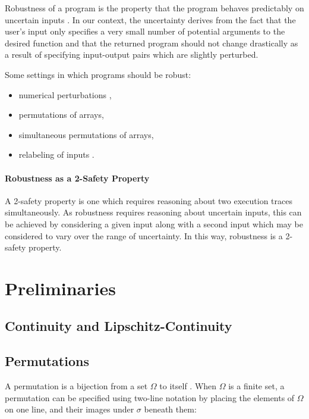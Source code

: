 \documentclass{llncs}
\begin{document}
Robustness of a program is the property that the program behaves predictably on uncertain inputs \cite{chaudhuri12}.  In our context, the uncertainty derives from the fact that the user's input only specifies a very small number of potential arguments to the desired function and that the returned program should not change drastically as a result of specifying input-output pairs which are slightly perturbed.

Some settings in which programs should be robust:
\begin{itemize}
\item numerical perturbations \cite{samanta14,chaudhuri10,chaudhuri11},
\item permutations of arrays,
\item simultaneous permutations of arrays,
\item relabeling of inputs \cite{zapponi03}.
\end{itemize}

\paragraph{Robustness as a 2-Safety Property}
A 2-safety property is one which requires reasoning about two execution traces simultaneously.  As robustness requires reasoning about uncertain inputs, this can be achieved by considering a given input along with a second input which may be considered to vary over the range of uncertainty.  In this way, robustness is a 2-safety property.

\section{Preliminaries}

\subsection{Continuity and Lipschitz-Continuity}


\subsection{Permutations}
\label{perms}

A permutation is a bijection from a set \(\Omega\) to itself \cite{dummitfoote}.  When \(\Omega\) is a finite set, a permutation can be specified using two-line notation by placing the elements of \(\Omega\) on one line, and their images under \(\sigma\) beneath them:
\end{document}
